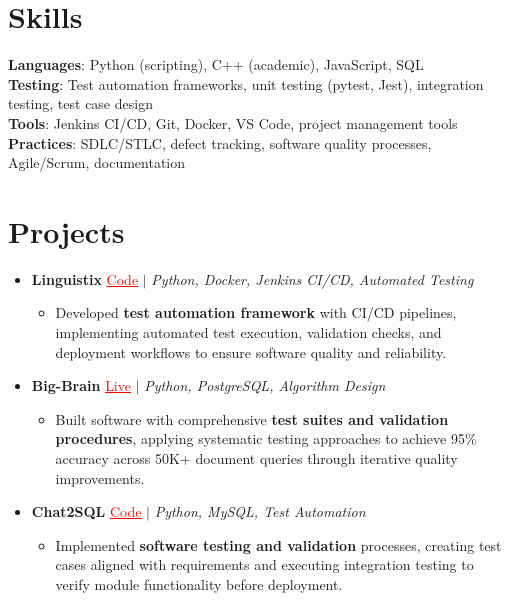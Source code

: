 \documentclass[letterpaper,10pt]{article}
\newcommand{\resumeItem}[1]{\item\small{{#1 \vspace{-2pt}}}}
\newcommand{\resumeProjectHeading}[1]{\item \small #1 \vspace{-2pt}}
\newcommand{\resumeSubHeadingListStart}{\begin{itemize}[leftmargin=0.0in, label={}]}
\newcommand{\resumeSubHeadingListEnd}{\end{itemize}}
\newcommand{\resumeProjItemListStart}{\begin{itemize}[leftmargin=0.15in,label=\textbullet,itemsep=0pt,topsep=0pt,parsep=0pt,partopsep=0pt]}
\newcommand{\resumeProjItemListEnd}{\end{itemize}\vspace{-4pt}}
\begin{document}
\section{Skills}
\begin{itemize}[leftmargin=0.15in, label={}]
\small{\item{
\textbf{Languages}: Python (scripting), C++ (academic), JavaScript, SQL \\
\textbf{Testing}: Test automation frameworks, unit testing (pytest, Jest), integration testing, test case design \\
\textbf{Tools}: Jenkins CI/CD, Git, Docker, VS Code, project management tools \\
\textbf{Practices}: SDLC/STLC, defect tracking, software quality processes, Agile/Scrum, documentation
}}
\end{itemize}
\vspace{-16pt}
\section{Projects}
\resumeSubHeadingListStart
\vspace{-2pt}
\resumeProjectHeading{\textbf{Linguistix} {\href{https://github.com/SAHAJ-BHADJA/Linguistix}{\textcolor{red}{\underline{Code}}}} $|$ \emph{Python, Docker, Jenkins CI/CD, Automated Testing}}
\resumeProjItemListStart
\resumeItem{Developed \textbf{test automation framework} with CI/CD pipelines, implementing automated test execution, validation checks, and deployment workflows to ensure software quality and reliability.}
\resumeProjItemListEnd
\vspace{3pt}
\resumeProjectHeading{\textbf{Big-Brain} {\href{https://big-brain-pied.vercel.app/}{\textcolor{red}{\underline{Live}}}} $|$ \emph{Python, PostgreSQL, Algorithm Design}}
\resumeProjItemListStart
\resumeItem{Built software with comprehensive \textbf{test suites and validation procedures}, applying systematic testing approaches to achieve 95\% accuracy across 50K+ document queries through iterative quality improvements.}
\resumeProjItemListEnd
\vspace{3pt}
\resumeProjectHeading{\textbf{Chat2SQL} {\href{https://github.com/SAHAJ-BHADJA/Chat2SQL}{\textcolor{red}{\underline{Code}}}} $|$ \emph{Python, MySQL, Test Automation}}
\resumeProjItemListStart
\resumeItem{Implemented \textbf{software testing and validation} processes, creating test cases aligned with requirements and executing integration testing to verify module functionality before deployment.}
\resumeProjItemListEnd
\resumeSubHeadingListEnd
\end{document}
